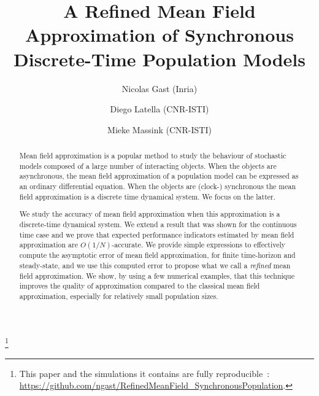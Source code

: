 \documentclass{amsart}
\begin{document}

\title{A Refined Mean Field Approximation of Synchronous Discrete-Time
  Population Models}

\author{Nicolas Gast (Inria) \and Diego Latella (CNR-ISTI) \and Mieke
  Massink (CNR-ISTI)}

\thanks{This paper and the simulations it
    contains are fully reproducible~:
    {\footnotesize\url{https://github.com/ngast/RefinedMeanField_SynchronousPopulation}}.
  }

\maketitle

\begin{abstract}
  Mean field approximation is a popular method to study the behaviour
  of stochastic models composed of a large number of interacting
  objects. When the objects are asynchronous, the mean field
  approximation of a population model can be expressed as an ordinary
  differential equation. When the objects are (clock-) synchronous the
  mean field approximation is a discrete time dynamical system. We
  focus on the latter.

  We study the accuracy of mean field approximation when this
  approximation is a discrete-time dynamical system. We extend a
  result that was shown for the continuous time case and we prove that
  expected performance indicators estimated by mean field approximation
  are $O(1/N)$-accurate. We provide simple expressions to effectively
  compute the asymptotic error of mean field approximation, for finite
  time-horizon and steady-state, and we use this computed error to
  propose what we call a \emph{refined} mean field approximation. We
  show, by using a few numerical examples, that this technique
  improves the quality of approximation compared to the classical mean
  field approximation, especially for relatively small population sizes.
\end{abstract}


\end{document}
